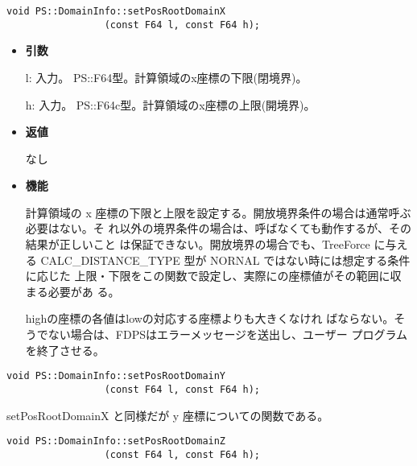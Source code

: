 
\begin{screen}
\begin{verbatim}
void PS::DomainInfo::setPosRootDomainX
                 (const F64 l, const F64 h);
\end{verbatim}
\end{screen}

\begin{itemize}

\item {\bf 引数}

l: 入力。 PS::F64型。計算領域のx座標の下限(閉境界)。

h: 入力。 PS::F64c型。計算領域のx座標の上限(開境界)。

\item {\bf 返値}

なし

\item {\bf 機能}

計算領域の x 座標の下限と上限を設定する。開放境界条件の場合は通常呼ぶ必要はない。そ
れ以外の境界条件の場合は、呼ばなくても動作するが、その結果が正しいこと
は保証できない。開放境界の場合でも、TreeForce に与える
CALC\_DISTANCE\_TYPE 型が NORNAL ではない時には想定する条件に応じた
上限・下限をこの関数で設定し、実際にの座標値がその範囲に収まる必要があ
る。

highの座標の各値はlowの対応する座標よりも大きくなけれ
ばならない。そうでない場合は、FDPSはエラーメッセージを送出し、ユーザー
プログラムを終了させる。

\end{itemize}


\begin{screen}
\begin{verbatim}
void PS::DomainInfo::setPosRootDomainY
                 (const F64 l, const F64 h);
\end{verbatim}
\end{screen}

setPosRootDomainX と同様だが y 座標についての関数である。


\begin{screen}
\begin{verbatim}
void PS::DomainInfo::setPosRootDomainZ
                 (const F64 l, const F64 h);
\end{verbatim}
\end{screen}

